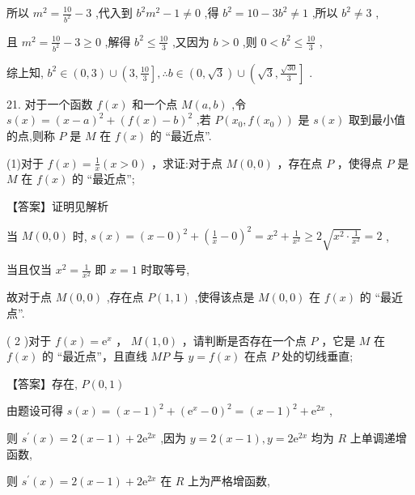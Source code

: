 \documentclass[10pt]{article}
\begin{document}
所以 \({m}^{2} = \frac{10}{{b}^{2}} - 3\) ,代入到 \({b}^{2}{m}^{2} - 1 \neq  0\) ,得 \({b}^{2} = {10} - 3{b}^{2} \neq  1\) ,所以 \({b}^{2} \neq  3\) ,

且 \({m}^{2} = \frac{10}{{b}^{2}} - 3 \geq  0\) ,解得 \({b}^{2} \leq  \frac{10}{3}\) ,又因为 \(b > 0\) ,则 \(0 < {b}^{2} \leq  \frac{10}{3}\) ,

综上知, \({b}^{2} \in  \left( {0,3}\right)  \cup  \left( {3,\frac{10}{3}}\right\rbrack  ,\therefore b \in  \left( {0,\sqrt{3}}\right)  \cup  \left( {\sqrt{3},\frac{\sqrt{30}}{3}}\right\rbrack\) .

21. 对于一个函数 \(f\left( x\right)\) 和一个点 \(M\left( {a,b}\right)\) ,令 \(s\left( x\right)  = {\left( x - a\right) }^{2} + {\left( f\left( x\right)  - b\right) }^{2}\) ,若 \(P\left( {{x}_{0},f\left( {x}_{0}\right) }\right)\) 是 \(s\left( x\right)\) 取到最小值的点,则称 \(P\) 是 \(M\) 在 \(f\left( x\right)\) 的 “最近点”.

(1)对于 \(f\left( x\right)  = \frac{1}{x}\left( {x > 0}\right)\) ，求证:对于点 \(M\left( {0,0}\right)\) ，存在点 \(P\) ，使得点 \(P\) 是 \(M\) 在 \(f\left( x\right)\) 的 “最近点”;

【答案】证明见解析

当 \(M\left( {0,0}\right)\) 时, \(s\left( x\right)  = {\left( x - 0\right) }^{2} + {\left( \frac{1}{x} - 0\right) }^{2} = {x}^{2} + \frac{1}{{x}^{2}} \geq  2\sqrt{{x}^{2} \cdot  \frac{1}{{x}^{2}}} = 2\) ,

当且仅当 \({x}^{2} = \frac{1}{{x}^{2}}\) 即 \(x = 1\) 时取等号,

故对于点 \(M\left( {0,0}\right)\) ,存在点 \(P\left( {1,1}\right)\) ,使得该点是 \(M\left( {0,0}\right)\) 在 \(f\left( x\right)\) 的 “最近点”.

( 2 )对于 \(f\left( x\right)  = {\mathrm{e}}^{x}\) ， \(M\left( {1,0}\right)\) ，请判断是否存在一个点 \(P\) ，它是 \(M\) 在 \(f\left( x\right)\) 的 “最近点”，且直线 \({MP}\) 与 \(y = f\left( x\right)\) 在点 \(P\) 处的切线垂直;

【答案】存在, \(P\left( {0,1}\right)\)

由题设可得 \(s\left( x\right)  = {\left( x - 1\right) }^{2} + {\left( {\mathrm{e}}^{x} - 0\right) }^{2} = {\left( x - 1\right) }^{2} + {\mathrm{e}}^{2x}\) ,

则 \({s}^{\prime }\left( x\right)  = 2\left( {x - 1}\right)  + 2{\mathrm{e}}^{2x}\) ,因为 \(y = 2\left( {x - 1}\right) ,y = 2{\mathrm{e}}^{2x}\) 均为 \(R\) 上单调递增函数,

则 \({s}^{\prime }\left( x\right)  = 2\left( {x - 1}\right)  + 2{\mathrm{e}}^{2x}\) 在 \(R\) 上为严格增函数,
\end{document}
